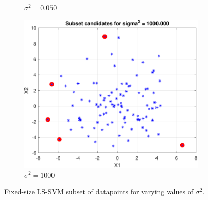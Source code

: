 \documentclass{article}
\begin{document}
\begin{figure}[h]
\begin{subfigure}[b]{0.3\textwidth}
                 \caption{$\sigma^2 = 0.050$}
                 \label{fig:subsets_sigma_2}
             \end{subfigure}
             \hfill
             \begin{subfigure}[b]{0.3\textwidth}
                 \centering
                 \includegraphics[width=\textwidth]{Assignment 3/figures/1_3/subsets_sig2_1000.000.pdf}
                 \caption{$\sigma^2 = 1000$}
                 \label{fig:subsets_sigma_3}
             \end{subfigure}
            \caption{Fixed-size LS-SVM subset of datapoints for varying values of $\sigma^2$.}
        \end{figure}
        
\end{document}
